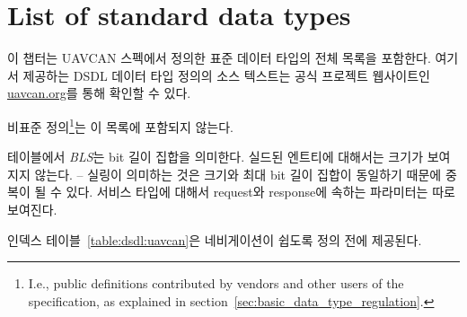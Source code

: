 \chapter{List of standard data types}\label{sec:sdt}

이 챕터는 UAVCAN 스펙에서 정의한 표준 데이터 타입의 전체 목록을 포함한다.
여기서 제공하는 DSDL 데이터 타입 정의의 소스 텍스트는 공식 프로젝트 웹사이트인 \href{http://uavcan.org}{uavcan.org}를 통해 확인할 수 있다.

비표준 정의\footnote{%
    I.e., public definitions contributed by vendors and other users
    of the specification, as explained in section~\ref{sec:basic_data_type_regulation}.
}는 이 목록에 포함되지 않는다.

테이블에서 \emph{BLS}는 bit 길이 집합을 의미한다.
실드된 엔트티에 대해서는 크기가 보여지지 않는다. -- 실링이 의미하는 것은 크기와 최대 bit 길이 집합이 동일하기 때문에 중복이 될 수 있다.
서비스 타입에 대해서 request와 response에 속하는 파라미터는 따로 보여진다.

인덱스 테이블~\ref{table:dsdl:uavcan}은 네비게이션이 쉽도록 정의 전에 제공된다.

\clearpage{}
